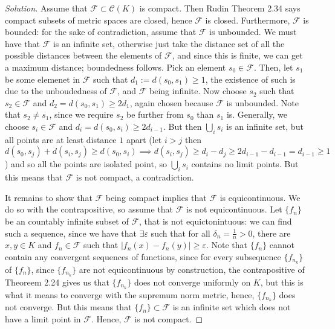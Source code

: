 \documentclass{article}
\newcommand{\ep}{{\varepsilon}}
\theoremstyle{remark}
\begin{document}
\begin{proof}[Solution]
	Assume that $\mathcal{F} \subset \mathcal{C}(K)$ is compact.
	Then Rudin Theorem 2.34 says compact subsets of metric spaces are closed,
	hence $\mathcal{F}$ is closed.
	Furthermore, $\mathcal{F}$ is bounded:
	for the sake of contradiction, assume that $\mathcal{F}$ is unbounded.
	We must have that $\mathcal{F}$ is an infinite set, otherwise
	just take the distance set of all the possible distances between the elements of $\mathcal{F}$,
	and since this is finite, we can get a maximum distance; boundedness follows.
	Pick an element $s_0 \in \mathcal{F}$.
	Then, let $s_1$ be some elemenet in $\mathcal{F}$ such that $d_1 := d(s_0,s_1) \geq 1$,
	the existence of such is due to the unboudedness of $\mathcal{F}$,
	and $\mathcal{F}$ being infinite.
	Now choose $s_2$ such that $s_2 \in \mathcal{F}$ and $d_2 = d(s_0,s_1) \geq 2d_1$,
	again chosen because $\mathcal{F}$ is unbounded.
	Note that $s_2 \neq s_1$, since we require $s_2$ be further from
	$s_0$ than $s_1$ is.
	Generally, we choose $s_i \in \mathcal{F}$ and $d_i = d(s_0,s_i) \geq 2d_{i-1}$.
	But then $\bigcup_i s_i$ is an infinite set,
	but all points are at least distance $1$ apart
	(let $i > j$ then $d(s_0,s_j) + d(s_i,s_j) \geq d(s_0,s_i)
	\implies d(s_i,s_j) \geq d_i - d_j \geq 2d_{i-1} - d_{i-1} = d_{i-1} \geq 1$)
	and so all the points are isolated point, so $\bigcup_i s_i$ contains no limit points.
	But this means that $\mathcal{F}$ is not compact, a contradiction.
	
	It remains to show that $\mathcal{F}$ being compact implies that $\mathcal{F}$ is equicontinuous.
	We do so with the contrapositive,
	so assume that $\mathcal{F}$ is not equicontinuous.
	Let $\{f_n\}$ be an countably infinite subset of $\mathcal{F}$,
	that is not equictonintuous:
	we can find such a sequence, since we have that $\exists \ep$
	such that for all $\delta_n = \frac{1}{n} > 0$, there are $x,y \in K$
	and $f_n \in \mathcal{F}$ such that $|f_n(x) - f_n(y)| \geq \ep$.
	Note that $\{f_n\}$ cannot contain any convergent sequences of functions,
	since for every subsequence $\{f_{n_k}\}$ of $\{f_n\}$,
	since $\{f_{n_k}\}$ are not equicontinuous by construction,
	the contrapositive of Theoreem 2.24
	gives us that $\{f_{n_k}\}$ does not converge uniformly on $K$,
	but this is what it means to converge with the supremum norm metric,
	hence, $\{f_{n_k}\}$ does not converge.
	But this means that $\{f_n\} \subset \mathcal{F}$ is an infinite set
	which does not have a limit point in $\mathcal{F}$.
	Hence, $\mathcal{F}$ is not compact.
\end{proof}
\end{document}
